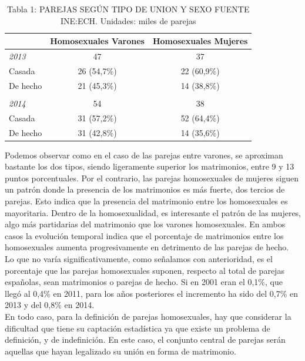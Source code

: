 \documentclass{article}
\begin{document}
\begin{table}[htbp]
	
\begin{tabular}{|l|c|c|}
	\hline
	& \textbf{\large{Homosexuales Varones}}&\textbf{\large{Homosexuales Mujeres}}\\
	\hline
	\textit{2013} & 47 & 37\\
	\hline
	Casada& 26 (54,7\%)&22 (60,9\%)\\
	\hline
	De hecho& 21 (45,3\%)&14 (38,8\%)\\
	\hline
	& &\\
	\hline
	\textit{2014}& 54 & 38\\
	\hline
	Casada& 31 (57,2\%)&52 (64,4\%)\\
	\hline
	De hecho& 31 (42,8\%)&14 (35,6\%)\\
	\hline
	
\end{tabular}
\label{Tabla 1}
\caption*{Tabla 1: PAREJAS SEGÚN TIPO DE UNION Y SEXO FUENTE INE:ECH. Unidades: miles de parejas}
\end{table}
Podemos observar como en el caso de las parejas entre varones, se aproximan bastante los dos tipos, siendo ligeramente superior los matrimonios, entre 9 y 13 puntos porcentuales. Por el contrario, las parejas homosexuales de mujeres siguen un patrón donde la presencia de los matrimonios es más fuerte, dos tercios de parejas. Esto indica que la presencia del matrimonio entre los homosexuales es mayoritaria. Dentro de la homosexualidad, es interesante el patrón de las mujeres, algo más partidarias del
matrimonio que los varones homosexuales. En ambos casos la evolución temporal indica que el porcentaje de matrimonios entre los homosexuales aumenta progresivamente en detrimento de las parejas de hecho. \\

Lo que no varía significativamente, como señalamos con anterioridad, es el porcentaje que las parejas homosexuales suponen, respecto al total de parejas españolas, sean matrimonios o parejas de hecho. Si en 2001 eran el 0,1\%, que llegó al 0,4\% en 2011, para los años posteriores el incremento ha sido del 0,7\% en 2013 y del 0,8\% en 2014. \\

En todo caso, para la definición de parejas homosexuales, hay que considerar la dificultad que tiene su captación estadística ya que existe un problema de definición, y de indefinición. En este caso, el conjunto central de parejas serán aquellas que hayan legalizado su unión en forma de matrimonio. \\
\end{document}
